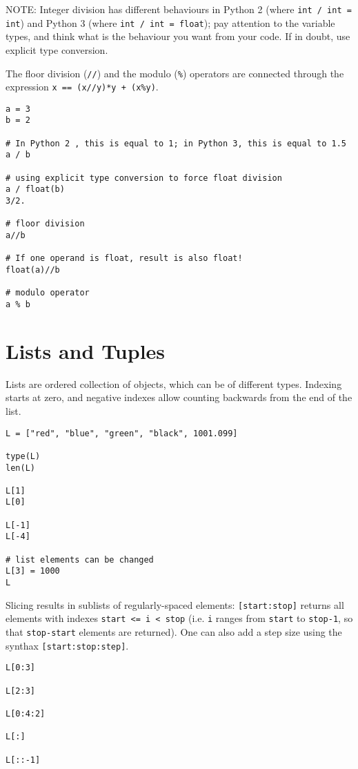 NOTE: Integer division has different behaviours in Python 2 (where {\tt int / int = int}) and Python 3 (where {\tt int / int = float}); pay attention to the variable types, and think what is the behaviour you want from your code. If in doubt, use explicit type conversion.

The floor division ({\tt //}) and the modulo ({\tt \%}) operators are connected through the expression {\tt x == (x//y)*y + (x\%y)}.

\begin{lstlisting}[frame=single]
a = 3
b = 2

# In Python 2 , this is equal to 1; in Python 3, this is equal to 1.5
a / b

# using explicit type conversion to force float division
a / float(b)
3/2.

# floor division
a//b

# If one operand is float, result is also float!
float(a)//b

# modulo operator
a % b
\end{lstlisting}

\section{Lists and Tuples}

Lists are ordered collection of objects, which can be of different types. Indexing starts at zero, and negative indexes allow counting backwards from the end of the list.

\begin{lstlisting}[frame=single]
L = ["red", "blue", "green", "black", 1001.099]

type(L)
len(L)

L[1]
L[0]

L[-1]
L[-4]

# list elements can be changed
L[3] = 1000
L
\end{lstlisting}

Slicing results in sublists of regularly-spaced elements: {\tt [start:stop]} returns all elements with indexes {\tt start <= i < stop} (i.e. {\tt i} ranges from {\tt start} to {\tt stop-1}, so that {\tt stop-start} elements are returned). One can also add a step size using the synthax {\tt [start:stop:step]}.

\begin{lstlisting}[frame=single]
L[0:3]

L[2:3]

L[0:4:2]

L[:]

L[::-1]
\end{lstlisting}



